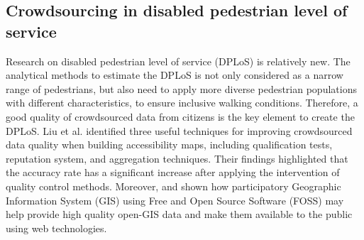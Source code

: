 \documentclass[10pt,conference,a4paper]{IEEEtran}
\begin{document}


\subsection{Crowdsourcing in disabled pedestrian level of service}
Research on disabled pedestrian level of service (DPLoS) is relatively new. The analytical methods to estimate the DPLoS is not only considered as a narrow range of pedestrians, but also need to apply more diverse pedestrian populations with different characteristics, to ensure inclusive walking conditions. Therefore, a good quality of crowdsourced data from citizens is the key element to create the DPLoS. Liu et al. \cite{liu2018} identified three useful techniques for improving crowdsourced data quality when building accessibility maps, including qualification tests, reputation system, and aggregation techniques. Their findings highlighted that the accuracy rate has a significant increase after applying the intervention of quality control methods. Moreover, \cite{brovelli_webbased_2014} and \cite{minghini_multi-dimensional_2014} shown how participatory Geographic Information System (GIS) using Free and Open Source Software (FOSS) may help provide high quality open-GIS data and make them available to the public using web technologies. 


\end{document}

